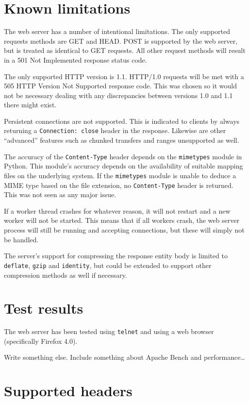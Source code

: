 \documentclass{sig-alternate}
\begin{document}
\section{Known limitations}

The web server has a number of intentional limitations. The only supported
requests methods are GET and HEAD. POST is supported by the web server, but
is treated as identical to GET requests. All other request methods will
result in a 501 Not Implemented response status code.

The only supported HTTP version is 1.1. HTTP/1.0 requests will be met with
a 505 HTTP Version Not Supported response code. This was chosen so it would
not be necessary dealing with any discrepancies between versions 1.0 and 1.1
there might exist.

Persistent connections are not supported. This is indicated to clients
by always returning a \verb+Connection: close+ header in the response.
Likewise are other ``advanced'' features such as chunked transfers and ranges
unsupported as well.

The accuracy of the \verb+Content-Type+ header depends on the \verb+mimetypes+
module in Python. This module's accuracy depends on the availability of
suitable mapping files on the underlying system. If the \verb+mimetypes+
module is unable to deduce a MIME type based on the file extension, no
\verb+Content-Type+ header is returned. This was not seen as any major issue.

If a worker thread crashes for whatever reason, it will not restart and a
new worker will not be started. This means that if all workers crash,
the web server process will still be running and accepting connections,
but these will simply not be handled.

The server's support for compressing the response entity body is limited to
\verb+deflate+, \verb+gzip+ and \verb+identity+, but could be extended to
support other compression methods as well if necessary.


\section{Test results}

The web server has been tested using \verb+telnet+ and using a web browser
(specifically Firefox 4.0).

Write something else. Include something about Apache Bench and
performance\ldots


\section{Supported headers}
\end{document}
